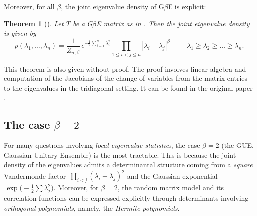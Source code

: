 \documentclass[letterpaper,11pt,oneside,reqno]{book}
\numberwithin{equation}{chapter}  %
\newtheorem{theorem}[proposition]{Theorem}
\theoremstyle{definition}
\begin{document}
Moreover, for all $\beta$, the joint eigenvalue density of G$\beta$E is
explicit:
\begin{theorem}[\cite{dumitriu2002matrix}]
	\label{lecture4:thm:DE-joint-eigenvalue-density}
	Let \(T\) be a G$\beta$E matrix as in .
	Then the joint eigenvalue density is given by
	\begin{equation*}
		p(\lambda_1,\ldots,\lambda_n)
		=
		\frac{1}{Z_{n,\beta}}\,
		e^{-\frac{1}{2}\sum_{i=1}^n \lambda_i^2}
		\prod_{1\le i<j\le n}|\lambda_i - \lambda_j|^\beta,
		\qquad
		\lambda_1\ge \lambda_2\ge \ldots \ge \lambda_n.
	\end{equation*}
\end{theorem}

This theorem is also given without proof. The proof involves
linear algebra and computation of the Jacobians of the
change of variables from the matrix entries to the
eigenvalues in the tridiagonal setting.  It can be found in
the original paper \cite{dumitriu2002matrix}.

\subsection{The case \texorpdfstring{$\beta=2$}{beta=2}}
\label{lecture4:subsec:beta2-case}

For many questions involving \emph{local eigenvalue statistics},
the case \(\beta=2\) (the GUE, Gaussian Unitary Ensemble) is the most tractable.
This is because the joint density of the eigenvalues
admits a determinantal structure coming from
a \emph{square} Vandermonde factor
\(\,\prod_{i<j} (\lambda_i - \lambda_j)^2\)
and the Gaussian exponential
\(\,\exp\bigl(-\tfrac12 \sum \lambda_j^2\bigr)\).
Moreover, for \(\beta=2\), the random matrix model
and its correlation functions
can be expressed explicitly through determinants involving
\emph{orthogonal polynomials}, namely, the \emph{Hermite polynomials}.
\end{document}
